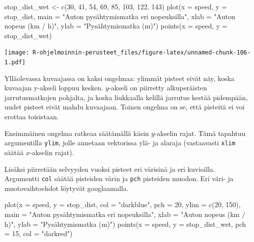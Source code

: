 \documentclass[
]{book}
\newenvironment{Shaded}{\begin{snugshade}}{\end{snugshade}}
\newcommand{\AttributeTok}[1]{\textcolor[rgb]{0.77,0.63,0.00}{#1}}
\newcommand{\DecValTok}[1]{\textcolor[rgb]{0.00,0.00,0.81}{#1}}
\newcommand{\FunctionTok}[1]{\textcolor[rgb]{0.00,0.00,0.00}{#1}}
\newcommand{\NormalTok}[1]{#1}
\newcommand{\OtherTok}[1]{\textcolor[rgb]{0.56,0.35,0.01}{#1}}
\newcommand{\StringTok}[1]{\textcolor[rgb]{0.31,0.60,0.02}{#1}}
\begin{document}
\begin{Shaded}
\begin{Highlighting}[]
\NormalTok{stop\_dist\_wet }\OtherTok{\textless{}{-}} \FunctionTok{c}\NormalTok{(}\DecValTok{30}\NormalTok{, }\DecValTok{41}\NormalTok{, }\DecValTok{54}\NormalTok{, }\DecValTok{69}\NormalTok{, }\DecValTok{85}\NormalTok{, }\DecValTok{103}\NormalTok{, }\DecValTok{122}\NormalTok{, }\DecValTok{143}\NormalTok{)}
\FunctionTok{plot}\NormalTok{(}\AttributeTok{x =}\NormalTok{ speed, }\AttributeTok{y =}\NormalTok{ stop\_dist,}
     \AttributeTok{main =} \StringTok{"Auton pysähtymismatka eri nopeuksilla"}\NormalTok{,}
     \AttributeTok{xlab =} \StringTok{"Auton nopeus (km / h)"}\NormalTok{, }\AttributeTok{ylab =} \StringTok{"Pysähtymismatka (m)"}\NormalTok{)}
\FunctionTok{points}\NormalTok{(}\AttributeTok{x =}\NormalTok{ speed, }\AttributeTok{y =}\NormalTok{ stop\_dist\_wet)}
\end{Highlighting}
\end{Shaded}

\texttt{[image: R-ohjelmoinnin-perusteet\_files/figure-latex/unnamed-chunk-106-1.pdf]}

Ylläolevassa kuvaajassa on kaksi ongelmaa: ylimmät pisteet eivät näy, koska kuvaajan y-akseli loppuu kesken. \(y\)-akseli on piirretty alkuperäisten jarrutusmatkojen pohjalta, ja koska liukkaalla kelillä jarrutus kestää pidempään, uudet pisteet eivät mahdu kuvaajaan. Toinen ongelma on se, että pisteitä ei voi erottaa toisistaan.

Ensimmäinen ongelma ratkeaa säätämällä käsin \(y\)-akselin rajat. Tämä tapahtuu argumentilla \texttt{ylim}, jolle annetaan vektorissa ylä- ja alaraja (vastaavasti \texttt{xlim} säätää \(x\)-akselin rajat).

Lisäksi piirretään selvyyden vuoksi pisteet eri värisinä ja eri kuvioilla. Argumentti \texttt{col} säätää pisteiden värin ja \texttt{pch} pisteiden muodon. Eri väri- ja muotovaihtoehdot löytyvät googlaamalla.

\begin{Shaded}
\begin{Highlighting}[]
\FunctionTok{plot}\NormalTok{(}\AttributeTok{x =}\NormalTok{ speed, }\AttributeTok{y =}\NormalTok{ stop\_dist,}
     \AttributeTok{col =} \StringTok{"darkblue"}\NormalTok{, }\AttributeTok{pch =} \DecValTok{20}\NormalTok{,}
     \AttributeTok{ylim =} \FunctionTok{c}\NormalTok{(}\DecValTok{20}\NormalTok{, }\DecValTok{150}\NormalTok{),}
     \AttributeTok{main =} \StringTok{"Auton pysähtymismatka eri nopeuksilla"}\NormalTok{,}
     \AttributeTok{xlab =} \StringTok{"Auton nopeus (km / h)"}\NormalTok{, }\AttributeTok{ylab =} \StringTok{"Pysähtymismatka (m)"}\NormalTok{)}
\FunctionTok{points}\NormalTok{(}\AttributeTok{x =}\NormalTok{ speed, }\AttributeTok{y =}\NormalTok{ stop\_dist\_wet, }\AttributeTok{pch =} \DecValTok{15}\NormalTok{, }\AttributeTok{col =} \StringTok{"darkred"}\NormalTok{)}
\end{Highlighting}
\end{Shaded}
\end{document}
